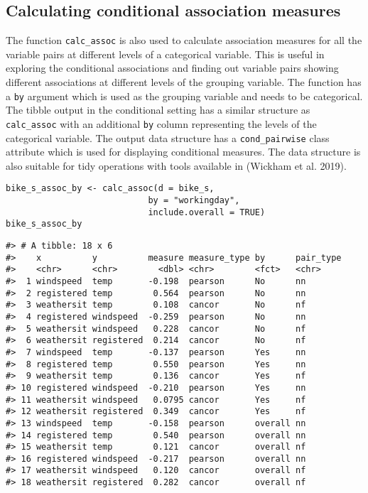 \hypertarget{calculating-conditional-association-measures}{%
\subsection{Calculating conditional association measures}\label{calculating-conditional-association-measures}}

The function \texttt{calc\_assoc} is also used to calculate association measures for all the variable pairs at different levels of a categorical variable. This is useful in exploring the conditional associations and finding out variable pairs showing different associations at different levels of the grouping variable. The function has a \texttt{by} argument which is used as the grouping variable and needs to be categorical. The tibble output in the conditional setting has a similar structure as \texttt{calc\_assoc} with an additional \texttt{by} column representing the levels of the categorical variable. The output data structure has a \texttt{cond\_pairwise} class attribute which is used for displaying conditional measures. The data structure is also suitable for tidy operations with tools available in  (Wickham et al. 2019).

\begin{verbatim}
bike_s_assoc_by <- calc_assoc(d = bike_s,
                            by = "workingday",
                            include.overall = TRUE)
bike_s_assoc_by
\end{verbatim}

\begin{verbatim}
#> # A tibble: 18 x 6
#>    x          y          measure measure_type by      pair_type
#>    <chr>      <chr>        <dbl> <chr>        <fct>   <chr>    
#>  1 windspeed  temp       -0.198  pearson      No      nn       
#>  2 registered temp        0.564  pearson      No      nn       
#>  3 weathersit temp        0.108  cancor       No      nf       
#>  4 registered windspeed  -0.259  pearson      No      nn       
#>  5 weathersit windspeed   0.228  cancor       No      nf       
#>  6 weathersit registered  0.214  cancor       No      nf       
#>  7 windspeed  temp       -0.137  pearson      Yes     nn       
#>  8 registered temp        0.550  pearson      Yes     nn       
#>  9 weathersit temp        0.136  cancor       Yes     nf       
#> 10 registered windspeed  -0.210  pearson      Yes     nn       
#> 11 weathersit windspeed   0.0795 cancor       Yes     nf       
#> 12 weathersit registered  0.349  cancor       Yes     nf       
#> 13 windspeed  temp       -0.158  pearson      overall nn       
#> 14 registered temp        0.540  pearson      overall nn       
#> 15 weathersit temp        0.121  cancor       overall nf       
#> 16 registered windspeed  -0.217  pearson      overall nn       
#> 17 weathersit windspeed   0.120  cancor       overall nf       
#> 18 weathersit registered  0.282  cancor       overall nf
\end{verbatim}

